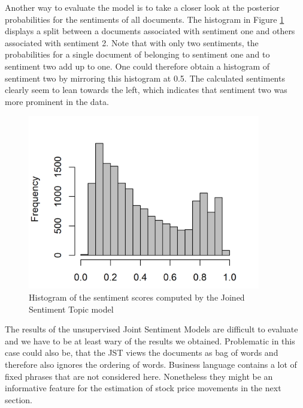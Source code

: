 Another way to evaluate the model is to take a closer look at the posterior probabilities for the sentiments of all documents. The histogram in Figure \ref{fig:JSTSentiment} displays a split between a documents associated with sentiment one and others associated with sentiment 2. Note that with only two sentiments, the probabilities for a single document of belonging to sentiment one and to sentiment two add up to one. One could therefore obtain a histogram of sentiment two by mirroring this histogram at 0.5. The calculated sentiments clearly seem to lean towards the left, which indicates that sentiment two was more prominent in the data. 
\begin{figure}[h]
\centering
\includegraphics[width=4in]{figures/2SentimentsJST_Histogram.png}
\caption{Histogram of the sentiment scores computed by the Joined Sentiment Topic model}
\label{fig:JSTSentiment}
\end{figure}

The results of the unsupervised Joint Sentiment Models are difficult to evaluate and we have to be at least wary of the results we obtained. Problematic in this case could also be, that the JST views the documents as bag of words and therefore also ignores the ordering of words. Business language contains a lot of fixed phrases that are not considered here. Nonetheless they might be an informative feature for the estimation of stock price movements in the next section. 


